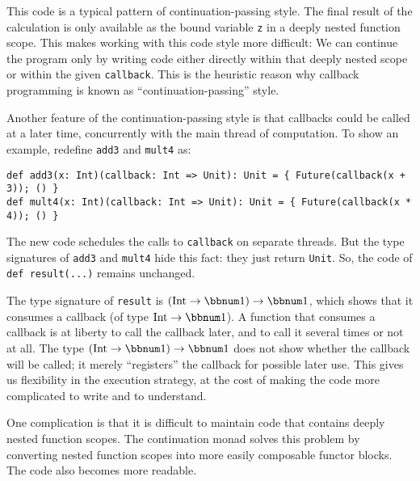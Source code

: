 \noindent This code is a typical pattern of continuation-passing style.
The final result of the calculation is only available as the bound
variable \lstinline!z! in a deeply nested function scope. This makes
working with this code style more difficult: We can continue the program
only by writing code either directly within that deeply nested scope
or within the given \lstinline!callback!. This is the heuristic reason
why callback programming is known as \textsf{``}continuation-passing\textsf{''} style.

Another feature of the continuation-passing style is that callbacks
could be called at a later time, concurrently with the main thread
of computation. To show an example, redefine \lstinline!add3! and
\lstinline!mult4! as:
\begin{lstlisting}
def add3(x: Int)(callback: Int => Unit): Unit = { Future(callback(x + 3)); () }
def mult4(x: Int)(callback: Int => Unit): Unit = { Future(callback(x * 4)); () }
\end{lstlisting}
The new code schedules the calls to \lstinline!callback! on separate
threads. But the type signatures of \lstinline!add3! and \lstinline!mult4!
hide this fact: they just return \lstinline!Unit!. So, the code of
\lstinline!def result(...)! remains unchanged.

The type signature of \lstinline!result! is $\left(\text{Int}\rightarrow\bbnum 1\right)\rightarrow\bbnum 1$,
which shows that it consumes a callback (of type $\text{Int}\rightarrow\bbnum 1$).
A function that consumes a callback is at liberty to call the callback
later, and to call it several times or not at all. The type $\left(\text{Int}\rightarrow\bbnum 1\right)\rightarrow\bbnum 1$
does not show whether the callback will be called; it merely \textsf{``}registers\textsf{''}
the callback for possible later use. This gives us flexibility in
the execution strategy, at the cost of making the code more complicated
to write and to understand.

One complication is that it is difficult to maintain code that contains
deeply nested function scopes. The continuation monad solves this
problem by converting nested function scopes into more easily composable
functor blocks. The code also becomes more readable.

